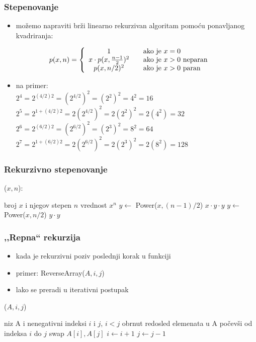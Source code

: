\documentclass[compress]{beamer}
\begin{document}
\begin{frame}[fragile]
  \frametitle{Stepenovanje}
  \begin{itemize}
    \item možemo napraviti brži linearno rekurzivan algoritam pomoću ponavljanog kvadriranja:
  \end{itemize}
  $$ p(x,n) = \left\{ \begin{array}{c l} 1 & \quad \text{ako je } x=0 \\x\cdot p(x, \frac{n-1}{2})^2 & \quad \text{ako je } x>0 \text{ neparan}\\p(x,n/2)^2 & \quad \text{ako je } x>0 \text{ paran} \end{array}\right. $$
  \begin{itemize}
    \item na primer: \\
    $ 2^4 = 2^{(4/2)2} = (2^{4/2})^2 = (2^2)^2 = 4^2 = 16 $ \\
    $ 2^5 = 2^{1+(4/2)2} = 2(2^{4/2})^2 = 2(2^2)^2 = 2(4^2) = 32 $ \\
    $ 2^6 = 2^{(6/2)2} = (2^{6/2})^2 = (2^3)^2 = 8^2 = 64 $ \\
    $ 2^7 = 2^{1+(6/2)2} = 2(2^{6/2})^2 = 2(2^3)^2 = 2(8^2) = 128$
  \end{itemize}
\end{frame}

\begin{frame}[fragile]
  \frametitle{Rekurzivno stepenovanje}
($x, n$):
\begin{algorithmic}
\REQUIRE broj $x$ i njegov stepen $n$
\ENSURE vrednost $x^n$
\ENDIF
{}
  \STATE $y \leftarrow$ Power($x, (n-1)/2$) 
  \RETURN $x\cdot y\cdot y$
\ELSE
  \STATE $y \leftarrow$ Power($x, n/2$)
  \RETURN $y\cdot y$  
\ENDIF  
\end{algorithmic}
\end{frame}

\begin{frame}[fragile]
  \frametitle{,,Repna`` rekurzija}
  \begin{itemize}
    \item kada je rekurzivni poziv poslednji korak u funkciji
    \item primer: ReverseArray($A, i, j$)
    \item lako se preradi u iterativni postupak
  \end{itemize}
($A, i, j$)
\begin{algorithmic}
\REQUIRE niz A i nenegativni indeksi $i$ i $j$, $i<j$
\ENSURE obrnut redosled elemenata u A počevši od indeksa $i$ do $j$
  \STATE swap $A[i], A[j]$
  \STATE $i \leftarrow i + 1$
  \STATE $j \leftarrow j - 1$
\ENDWHILE
\end{algorithmic}
\end{frame}
\end{document}
